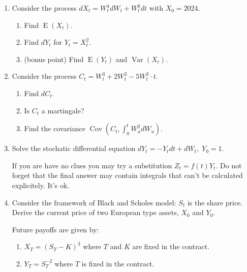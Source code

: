 \documentclass[12pt]{article}
\DeclareMathOperator{\Cov}{Cov}
\DeclareMathOperator{\Var}{Var}
\DeclareMathOperator{\E}{E}
\begin{document}
\begin{enumerate}
\item Consider the process $dX_t = W_t^4 dW_t + W_t^6 dt$ with $X_0 = 2024$.
\begin{enumerate}
  \item Find $\E(X_t)$.
  \item Find $dY_t$ for $Y_t = X_t^2$.
  \item (bonus point) Find $\E(Y_t)$ and $\Var(X_t)$.
\end{enumerate}

\item Consider the process $C_t = W_t^3 + 2W_t^2 - 5 W_t^3 \cdot t$.
\begin{enumerate}
  \item Find $dC_t$. 
  \item Is $C_t$ a martingale?
  \item Find the covariance $\Cov\left(C_t, \int_0^t W^2_u dW_u\right)$.
\end{enumerate}

\item Solve the stochatic differential equation
$dY_t = - Y_t dt + dW_t, \; Y_0 = 1$.

If you are have no clues you may try a substitution $Z_t = f(t) Y_t$. 
Do not forget that the final answer may contain integrals that can't be calculated explicitely. It's ok.



\item Consider the framework of Black and Scholes model: $S_t$ is the share price. 
Derive the current price of two European type assets, $X_0$ and $Y_0$. 

Future payoffs are given by:
\begin{enumerate}
  \item $X_T = (S_T - K)^3$ where $T$ and $K$ are fixed in the contract.
  \item $Y_T = S_T^{-2}$ where $T$ is fixed in the contract. 
\end{enumerate}


\end{enumerate}
\end{document}
